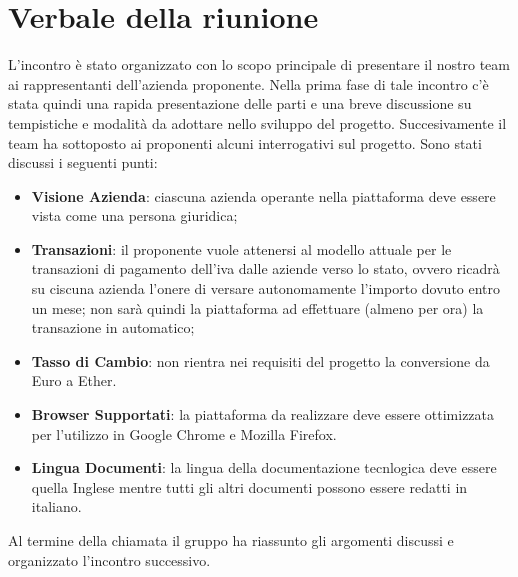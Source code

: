 \section{Verbale della riunione}
L'incontro è stato organizzato con lo scopo principale di presentare il nostro team ai rappresentanti dell'azienda proponente. Nella prima fase di tale incontro c'è stata quindi una rapida presentazione delle parti e una breve discussione su tempistiche e modalità da adottare nello sviluppo del progetto. Succesivamente il team ha sottoposto ai proponenti alcuni interrogativi sul progetto.
Sono stati discussi i seguenti punti: 
\begin{itemize}
	\item \textbf{Visione Azienda}: ciascuna azienda operante nella piattaforma deve essere vista come una persona giuridica;
	\item \textbf{Transazioni}: il proponente vuole attenersi al modello attuale per le transazioni di pagamento dell'iva dalle aziende verso lo stato, ovvero ricadrà su ciscuna azienda l'onere di versare autonomamente l'importo dovuto entro un mese; non sarà quindi la piattaforma ad effettuare (almeno per ora) la transazione in automatico;
	\item \textbf{Tasso di Cambio}: non rientra nei requisiti del progetto la conversione da Euro a Ether.
	\item \textbf{Browser Supportati}: la piattaforma da realizzare deve essere ottimizzata per l'utilizzo in Google Chrome e Mozilla Firefox.
	\item \textbf{Lingua Documenti}: la lingua della documentazione tecnlogica deve essere quella Inglese mentre tutti gli altri documenti possono essere redatti in italiano.

\end{itemize}
Al termine della chiamata il gruppo ha riassunto gli argomenti discussi e organizzato l'incontro successivo.
